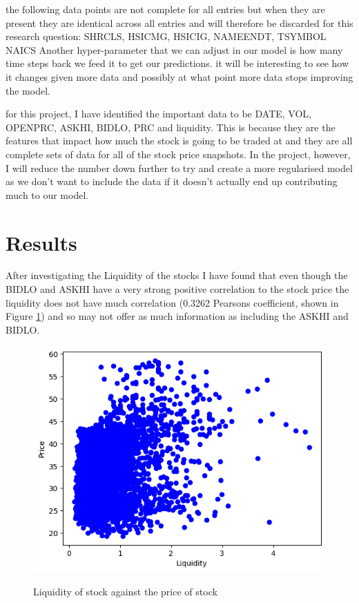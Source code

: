 \documentclass{report}
\begin{document}
the following data points are not complete for all entries but when they are present they are identical across all entries and will therefore be discarded for this research question: SHRCLS, HSICMG, HSICIG, NAMEENDT, TSYMBOL NAICS
Another hyper-parameter that we can adjust in our model is how many time steps back we feed it to get our predictions. it will be interesting to see how it changes given more data and possibly at what point more data stops improving the model.


for this project, I have identified the important data to be DATE, VOL, OPENPRC, ASKHI, BIDLO, PRC and liquidity. This is because they are the features that impact how much the stock is going to be traded at and they are all complete sets of data for all of the stock price snapshots. In the project, however, I will reduce the number down further to try and create a more regularised model as we don't want to include the data if it doesn't actually end up contributing much to our model.

\section{Results}

After investigating the Liquidity of the stocks I have found that even though the BIDLO and ASKHI have a very strong positive correlation to the stock price the liquidity does not have much correlation (0.3262 Pearsons coefficient, shown in Figure \ref{fig:LIQ}) and so may not offer as much information as including the ASKHI and BIDLO.

\begin{figure}
    \caption{Liquidity of stock against the price of stock}
    \centering
    \includegraphics[scale=0.5]{LIQ.png}
    \label{fig:LIQ}
\end{figure}
\end{document}
